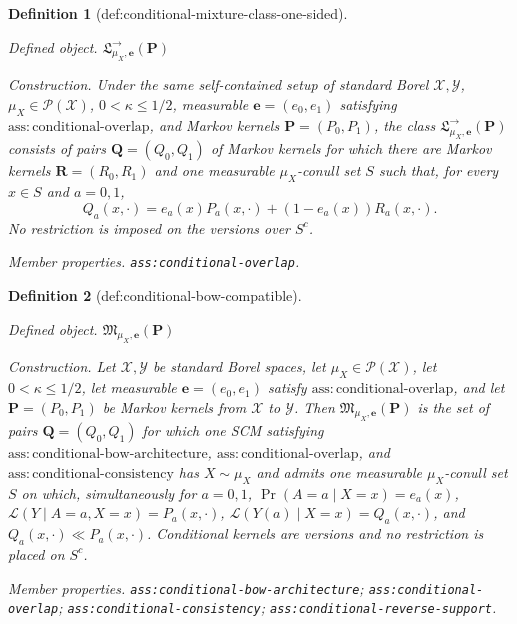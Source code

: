 \documentclass{article}
\newtheorem{definition}{Definition}
\begin{document}
\begin{definition}[def:conditional-mixture-class-one-sided]\label{def:conditional-mixture-class-one-sided}
\par\smallskip\noindent\emph{Defined object.} \(\mathfrak L^{\to}_{\mu_X,\boldsymbol e}(\boldsymbol P)\)
\par\smallskip\noindent\emph{Construction.} Under the same self-contained setup of standard Borel \(\mathcal X,\mathcal Y\), \(\mu_X\in\mathcal P(\mathcal X)\), \(0<\kappa\le1/2\), measurable \(\boldsymbol e=(e_0,e_1)\) satisfying \(\mathrm{ass:conditional\text{-}overlap}\), and Markov kernels \(\boldsymbol P=(P_0,P_1)\), the class \(\mathfrak L^{\to}_{\mu_X,\boldsymbol e}(\boldsymbol P)\) consists of pairs \(\boldsymbol Q=(Q_0,Q_1)\) of Markov kernels for which there are Markov kernels \(\boldsymbol R=(R_0,R_1)\) and one measurable \(\mu_X\)-conull set \(S\) such that, for every \(x\in S\) and \(a=0,1\),
\[
 Q_a(x,\cdot)=e_a(x)P_a(x,\cdot)+(1-e_a(x))R_a(x,\cdot).
\]
No restriction is imposed on the versions over \(S^c\).
\par\smallskip\noindent\emph{Member properties.} \texttt{ass:\allowbreak{}conditional-\allowbreak{}overlap}.
\end{definition}

\begin{definition}[def:conditional-bow-compatible]\label{def:conditional-bow-compatible}
\par\smallskip\noindent\emph{Defined object.} \(\mathfrak M_{\mu_X,\boldsymbol e}(\boldsymbol P)\)
\par\smallskip\noindent\emph{Construction.} Let \(\mathcal X,\mathcal Y\) be standard Borel spaces, let \(\mu_X\in\mathcal P(\mathcal X)\), let \(0<\kappa\le1/2\), let measurable \(\boldsymbol e=(e_0,e_1)\) satisfy \(\mathrm{ass:conditional\text{-}overlap}\), and let \(\boldsymbol P=(P_0,P_1)\) be Markov kernels from \(\mathcal X\) to \(\mathcal Y\).  Then \(\mathfrak M_{\mu_X,\boldsymbol e}(\boldsymbol P)\) is the set of pairs \(\boldsymbol Q=(Q_0,Q_1)\) for which one SCM satisfying \(\mathrm{ass:conditional\text{-}bow\text{-}architecture}\), \(\mathrm{ass:conditional\text{-}overlap}\), and \(\mathrm{ass:conditional\text{-}consistency}\) has \(X\sim\mu_X\) and admits one measurable \(\mu_X\)-conull set \(S\) on which, simultaneously for \(a=0,1\), \(\Pr(A=a\mid X=x)=e_a(x)\), \(\mathcal L(Y\mid A=a,X=x)=P_a(x,\cdot)\), \(\mathcal L(Y(a)\mid X=x)=Q_a(x,\cdot)\), and \(Q_a(x,\cdot)\ll P_a(x,\cdot)\).  Conditional kernels are versions and no restriction is placed on \(S^c\).
\par\smallskip\noindent\emph{Member properties.} \texttt{ass:\allowbreak{}conditional-\allowbreak{}bow-\allowbreak{}architecture}; \texttt{ass:\allowbreak{}conditional-\allowbreak{}overlap}; \texttt{ass:\allowbreak{}conditional-\allowbreak{}consistency}; \texttt{ass:\allowbreak{}conditional-\allowbreak{}reverse-\allowbreak{}support}.
\end{definition}
\end{document}
